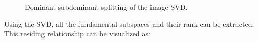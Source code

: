 \documentclass[
  journal,
]{IEEEtran}%
\begin{document}
\begin{figure}


\caption{\label{fig-dom-subdom}Dominant-subdominant splitting of the
image SVD.}

\end{figure}%

Using the SVD, all the fundamental subspaces and their rank can be
extracted. This residing relationship can be visualized as:
\end{document}

